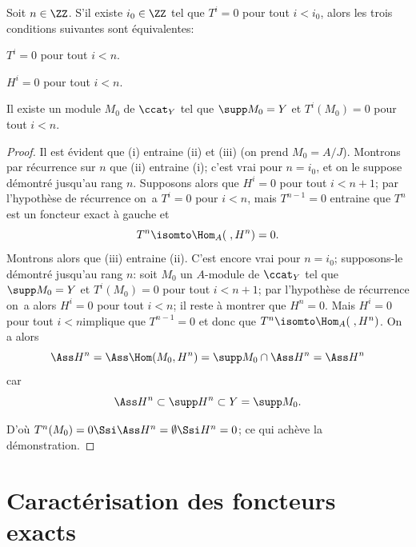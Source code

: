\begin{theoreme}
\label{IV.1.4} Soit $n\in \ZZ$. S'il existe $i_{0}\in \ZZ$ tel que $T^{i}=0$ pour tout $i<i_{0}$, alors les trois conditions suivantes sont \'equivalentes:
\begin{enumeratei}
\item
$T^{i}=0$ pour tout $i<n$.
\item
$H^{i}=0$ pour tout $i<n$.
\item
Il existe un module $M_{0}$ de $\ccat_{Y}$ tel que $\supp M_{0}=Y$ et $T^{i}(M_{0})=0$ pour tout $i<n$.
\end{enumeratei}
\end{theoreme}

\begin{proof}
Il est \'evident que (i) entraine (ii) et (iii) (on prend $M_{0}=A/J$). Montrons par r\'ecurrence sur $n$ que (ii) entraine (i); c'est vrai pour $n=i_{0}$, et on le suppose d\'emontr\'e jusqu'au rang $n$. Supposons alors que $H^{i}=0$ pour tout $i<n+1$; par l'hypoth\`ese de r\'ecurrence on~a $T^{i}=0$ pour $i<n$, mais $T^{n-1}=0$ entraine que $T^{n}$ est un foncteur exact \`a gauche et
\begin{equation*} T^{n}\isomto\Hom_{A}(\;, H^{n})=0.
\end{equation*}
Montrons alors que (iii) entraine (ii). C'est encore vrai pour $n=i_{0}$; supposons-le d\'emontr\'e jusqu'au rang $n$: soit $M_{0}$ un $A$-module de $\ccat_{Y}$ tel que $\supp M_{0}=Y$ et $T^{i}(M_{0})=0$ pour tout $i<n+1$; par l'hypoth\`ese de r\'ecurrence on~a alors $H^{i}=0$ pour tout $i<n$; il reste \`a montrer que $H^{n}=0$. Mais \og $H^{i}=0$ pour tout $i<n$\fg implique que $T^{n-1}=0$ et donc que $T^{n}\isomto\Hom_{A}(\;, H^{n})$. On a alors
\begin{equation*}
\Ass H^{n}=\Ass \Hom(M_{0}, H^{n})=\supp M_{0}\cap \Ass H^{n}= \Ass H^{n}
\end{equation*}
car
\begin{equation*}
\Ass H^{n}\subset \supp H^{n}\subset Y= \supp M_{0}.
\end{equation*}

D'o\`u $T^{n}(M_{0})=0\Ssi \Ass H^{n}=\emptyset \Ssi H^{n}=0$; ce qui ach\`eve la d\'emonstration.
\skipqed
\end{proof}

\section{Caract\'erisation des foncteurs exacts} \label{IV.2}

